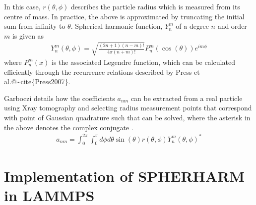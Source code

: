 \documentclass[letterpaper,10pt,english]{sphinxmanual}
\begin{document}
\sphinxAtStartPar
In this case, \(r(\theta,\phi)\) describes the particle radius which is measured from its centre of mass. In practice, the above is approximated by truncating the initial sum from infinity to \(\theta\). Spherical harmonic function, \(Y_n^m\) of a degree \(n\) and order \(m\) is given as
\begin{equation*}
\begin{split}Y_n^m(\theta, \phi) = \sqrt{\frac{(2n+1)(n-m)!}{4\pi(n+m)!}}P_n^m(\cos(\theta))e^{im\phi}\end{split}
\end{equation*}
\sphinxAtStartPar
where \(P_n^m(x)\) is the associated Legendre function, which can be calculated efficiently through the recurrence relations described by Press et al.@\textasciitilde{}cite\{Press2007\}.

\sphinxAtStartPar
Garboczi details how the coefficients \(a_{nm}\) can be extracted from a real particle using X\sphinxhyphen{}ray tomography and selecting radius measurement points that correspond with point of Gaussian quadrature such that
can be solved, where the asterisk in the above denotes the complex conjugate  .
\begin{equation*}
\begin{split}a_{nm} = \int_0^{2\pi}\int_0^\pi  d\phi d\theta \sin(\theta) r(\theta, \phi) Y_n^m(\theta, \phi)^*\end{split}
\end{equation*}
\noindent{}

\noindent{}

\noindent{}

\sphinxstepscope


\section{Implementation of SPHERHARM in LAMMPS}
\label{\detokenize{Sections/3_implementation:implementation-of-spherharm-in-lammps}}\label{\detokenize{Sections/3_implementation::doc}}
\end{document}
